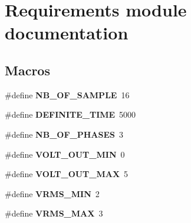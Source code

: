 \hypertarget{group___requirements__module}{}\section{Requirements module documentation}
\label{group___requirements__module}
\subsection*{Macros}
\begin{DoxyCompactItemize}
\item 
\hypertarget{group___requirements__module_ga3c0a8fbd0ad55d031bf5884a5a52afb6}{}\#define {\bfseries N\+B\+\_\+\+O\+F\+\_\+\+S\+A\+M\+P\+L\+E}~16\label{group___requirements__module_ga3c0a8fbd0ad55d031bf5884a5a52afb6}

\item 
\hypertarget{group___requirements__module_ga142e51bd237182cefcb6564944c6ce14}{}\#define {\bfseries D\+E\+F\+I\+N\+I\+T\+E\+\_\+\+T\+I\+M\+E}~5000\label{group___requirements__module_ga142e51bd237182cefcb6564944c6ce14}

\item 
\hypertarget{group___requirements__module_gabd762b09ff0ea8bca8f603b2e3c392f2}{}\#define {\bfseries N\+B\+\_\+\+O\+F\+\_\+\+P\+H\+A\+S\+E\+S}~3\label{group___requirements__module_gabd762b09ff0ea8bca8f603b2e3c392f2}

\item 
\hypertarget{group___requirements__module_ga4b2b092ab309efaa07b7a947dcd3ea78}{}\#define {\bfseries V\+O\+L\+T\+\_\+\+O\+U\+T\+\_\+\+M\+I\+N}~0\label{group___requirements__module_ga4b2b092ab309efaa07b7a947dcd3ea78}

\item 
\hypertarget{group___requirements__module_ga322b70a9d81ee7d83d42fd622eb8a4c9}{}\#define {\bfseries V\+O\+L\+T\+\_\+\+O\+U\+T\+\_\+\+M\+A\+X}~5\label{group___requirements__module_ga322b70a9d81ee7d83d42fd622eb8a4c9}

\item 
\hypertarget{group___requirements__module_ga9a4a88e02d555596cd1f48e6359dc739}{}\#define {\bfseries V\+R\+M\+S\+\_\+\+M\+I\+N}~2\label{group___requirements__module_ga9a4a88e02d555596cd1f48e6359dc739}

\item 
\hypertarget{group___requirements__module_gafd2b1a9f7789d3296c754be8a7dc26c7}{}\#define {\bfseries V\+R\+M\+S\+\_\+\+M\+A\+X}~3\label{group___requirements__module_gafd2b1a9f7789d3296c754be8a7dc26c7}


\end{DoxyCompactItemize}
